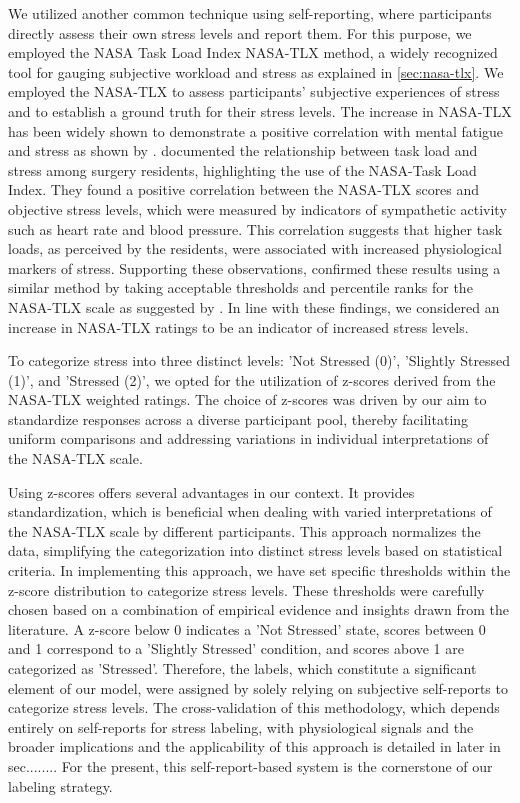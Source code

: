 We utilized another common technique using self-reporting, where participants directly assess their own stress levels and report them. For this purpose, we employed the NASA Task Load Index \gls{NASA-TLX} method, a widely recognized tool for gauging subjective workload and stress as explained in \autoref{sec:nasa-tlx}. We employed the \gls{NASA-TLX} to assess participants' subjective experiences of stress and to establish a ground truth for their stress levels.
The increase in \gls{NASA-TLX} has been widely shown to demonstrate a positive correlation with mental fatigue and stress as shown by \parencites{tlxstress}{Kaduk2020}. \textcite{Bakhsh2019-kr} documented the relationship between task load and stress among surgery residents, highlighting the use of the NASA-Task Load Index. They found a positive correlation between the NASA-TLX scores and objective stress levels, which were measured by indicators of sympathetic activity such as heart rate and blood pressure. This correlation suggests that higher task loads, as perceived by the residents, were associated with increased physiological markers of stress. Supporting these observations, \textcite{Favre-Felix2022-ln} confirmed these results using a similar method by taking acceptable thresholds and percentile ranks for the NASA-TLX scale as suggested by \textcite{Grier2015-uq}. In line with these findings, we considered an increase in \gls{NASA-TLX} ratings to be an indicator of increased stress levels.

To categorize stress into three distinct levels: 'Not Stressed (0)', 'Slightly Stressed (1)', and 'Stressed (2)', we opted for the utilization of z-scores derived from the NASA-TLX weighted ratings. The choice of z-scores was driven by our aim to standardize responses across a diverse participant pool, thereby facilitating uniform comparisons and addressing variations in individual interpretations of the NASA-TLX scale.

Using z-scores offers several advantages in our context. It provides standardization, which is beneficial when dealing with varied interpretations of the NASA-TLX scale by different participants. This approach normalizes the data, simplifying the categorization into distinct stress levels based on statistical criteria. 
In implementing this approach, we have set specific thresholds within the z-score distribution to categorize stress levels. These thresholds were carefully chosen based on a combination of empirical evidence and insights drawn from the literature. A z-score below 0 indicates a 'Not Stressed' state, scores between 0 and 1 correspond to a 'Slightly Stressed' condition, and scores above 1 are categorized as 'Stressed'. Therefore, the labels, which constitute a significant element of our model, were assigned by solely relying on subjective self-reports to categorize stress levels. The cross-validation of this methodology, which depends entirely on self-reports for stress labeling, with physiological signals and the broader implications and the applicability of this approach is detailed in later in sec........ For the present, this self-report-based system is the cornerstone of our labeling strategy.

